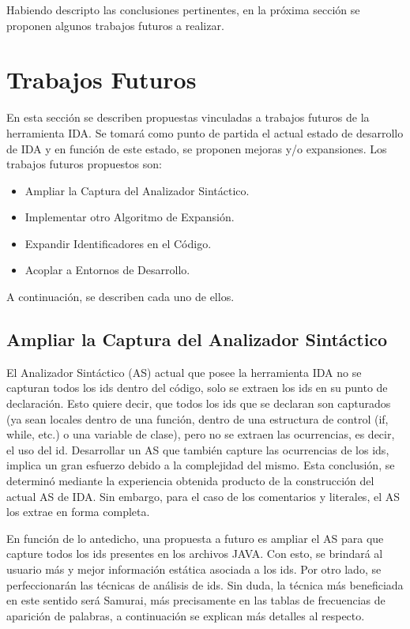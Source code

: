 Habiendo descripto las conclusiones pertinentes, en la próxima sección se proponen algunos trabajos futuros a realizar.

\section{Trabajos Futuros}

En esta sección se describen propuestas vinculadas a trabajos futuros de la herramienta IDA. Se tomará como punto de partida el actual estado de desarrollo de IDA y en función de este estado, se proponen mejoras y/o expansiones. Los trabajos futuros propuestos son:

\begin{itemize}

\item Ampliar la Captura del Analizador Sintáctico.

\item Implementar otro Algoritmo de Expansión.

\item Expandir Identificadores en el Código.

\item Acoplar a Entornos de Desarrollo.

\end{itemize}

A continuación, se describen cada uno de ellos.

\subsection{Ampliar la Captura del Analizador Sintáctico}

El Analizador Sintáctico (AS) actual que posee la herramienta IDA no se capturan todos los ids dentro del código, solo se extraen los ids en su punto de declaración.
Esto quiere decir, que todos los ids que se declaran son capturados (ya sean locales dentro de una función, dentro de una estructura de control (if, while, etc.) o una variable de clase), pero no se extraen las ocurrencias, es decir, el uso del id. 
Desarrollar un AS que también capture las ocurrencias de los ids, implica un gran esfuerzo debido a la complejidad del mismo. Esta conclusión, se determinó mediante la experiencia obtenida producto de la construcción del actual AS de IDA. Sin embargo, para el caso de los comentarios y literales, el AS los extrae en forma completa. 

En función de lo antedicho, una propuesta a futuro es ampliar el AS para que capture todos los ids presentes en los archivos JAVA. Con esto, se brindará al usuario más y mejor información estática asociada a los ids. Por otro lado, se perfeccionarán las técnicas de análisis de ids. 
Sin duda, la técnica más beneficiada en este sentido será Samurai, más precisamente en las tablas de frecuencias de aparición de palabras, a continuación se explican más detalles al respecto.


